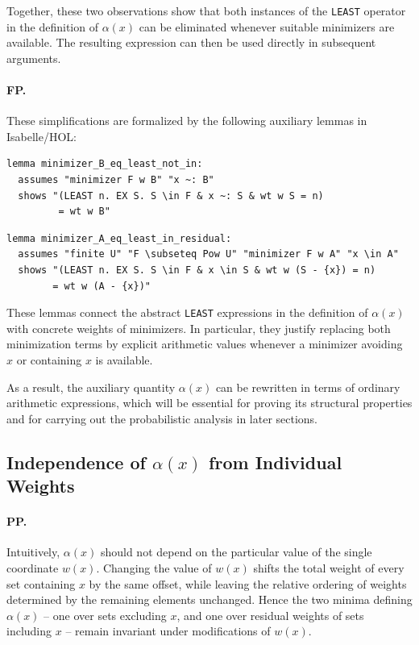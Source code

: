 Together, these two observations show that both instances of the \texttt{LEAST} operator in the definition of $\alpha(x)$ can be eliminated whenever suitable minimizers are available.
The resulting expression can then be used directly in subsequent arguments.

\paragraph{FP.}
These simplifications are formalized by the following auxiliary lemmas in Isabelle/HOL:

\listingneedspace
\begin{lstlisting}[language=Isabelle, caption={First LEAST Eliminated by a Minimizer}]
lemma minimizer_B_eq_least_not_in:
  assumes "minimizer F w B" "x ~: B"
  shows "(LEAST n. EX S. S \in F & x ~: S & wt w S = n) 
         = wt w B"
\end{lstlisting}

\listingneedspace
\begin{lstlisting}[language=Isabelle, caption={Second LEAST Eliminated by a Minimizer}]
lemma minimizer_A_eq_least_in_residual:
  assumes "finite U" "F \subseteq Pow U" "minimizer F w A" "x \in A"
  shows "(LEAST n. EX S. S \in F & x \in S & wt w (S - {x}) = n) 
        = wt w (A - {x})"
\end{lstlisting}



These lemmas connect the abstract \texttt{LEAST} expressions in the definition of $\alpha(x)$ with concrete weights of minimizers.
In particular, they justify replacing both minimization terms by explicit arithmetic values whenever a minimizer avoiding $x$ or containing $x$ is available.

As a result, the auxiliary quantity $\alpha(x)$ can be rewritten in terms of ordinary arithmetic expressions, which will be essential for proving its structural properties and for carrying out the probabilistic analysis in later sections.

\subsection{Independence of \texorpdfstring{$\alpha(x)$}{alpha(x)} from Individual Weights}
\label{sec:alpha_independence}

\paragraph{PP.}
Intuitively, $\alpha(x)$ should not depend on the particular value of the single coordinate $w(x)$.
Changing the value of $w(x)$ shifts the total weight of every set containing $x$ by the same offset, while leaving the relative ordering of weights determined by the remaining elements unchanged.
Hence the two minima defining $\alpha(x)$ -- one over sets excluding $x$, and one over residual weights of sets including $x$ -- remain invariant under modifications of $w(x)$.

